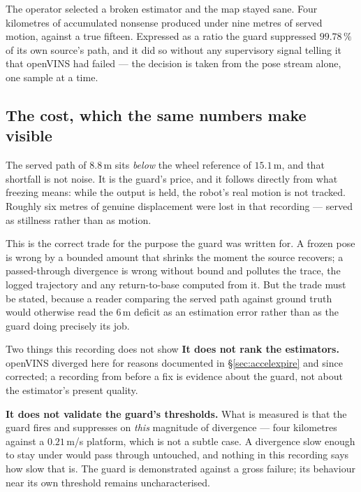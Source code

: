 \noindent The operator selected a broken estimator and the map stayed
sane. Four kilometres of accumulated nonsense produced under nine metres of
served motion, against a true fifteen. Expressed as a ratio the guard
suppressed $99.78\,\%$ of its own source's path, and it did so without any
supervisory signal telling it that openVINS had failed --- the decision is
taken from the pose stream alone, one sample at a time.

\subsection{The cost, which the same numbers make visible}

The served path of $8.8$\,m sits \emph{below} the wheel reference of
$15.1$\,m, and that shortfall is not noise. It is the guard's price, and it
follows directly from what freezing means: while the output is held, the
robot's real motion is not tracked. Roughly six metres of genuine
displacement were lost in that recording --- served as stillness rather than
as motion.

This is the correct trade for the purpose the guard was written for. A
frozen pose is wrong by a bounded amount that shrinks the moment the source
recovers; a passed-through divergence is wrong without bound and pollutes
the trace, the logged trajectory and any return-to-base computed from it.
But the trade must be stated, because a reader comparing the served path
against ground truth would otherwise read the $6$\,m deficit as an
estimation error rather than as the guard doing precisely its job.

\begin{trapbox}{Two things this recording does not show}
\textbf{It does not rank the estimators.} openVINS diverged here for
reasons documented in \S\ref{sec:accelexpire} and since corrected; a
recording from before a fix is evidence about the guard, not about the
estimator's present quality.

\textbf{It does not validate the guard's thresholds.} What is measured is
that the guard fires and suppresses on \emph{this} magnitude of divergence
--- four kilometres against a $0.21$\,m/s platform, which is not a subtle
case. A divergence slow enough to stay under
 would pass through untouched, and nothing in
this recording says how slow that is. The guard is demonstrated against a
gross failure; its behaviour near its own threshold remains uncharacterised.
\end{trapbox}

